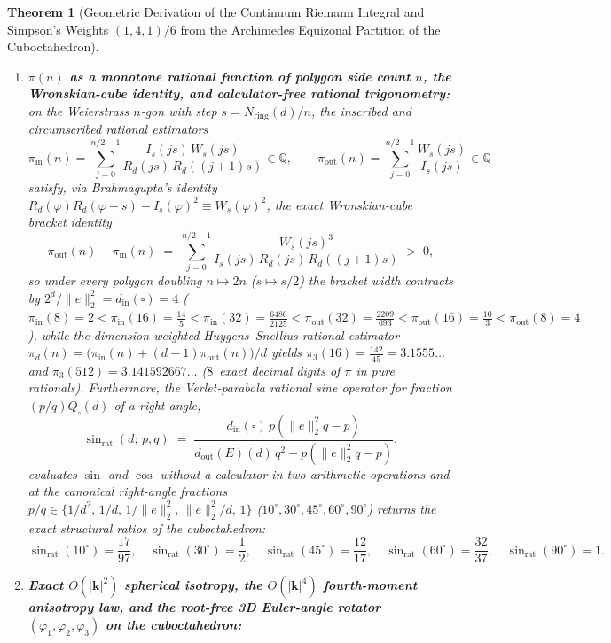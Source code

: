 \documentclass[11pt,a4paper]{article}
\theoremstyle{plain}
\newtheorem{theorem}{Theorem}[section]
\theoremstyle{definition}
\begin{document}
\begin{theorem}[Geometric Derivation of the Continuum Riemann Integral and Simpson's Weights $(1,4,1)/6$ from the Archimedes Equizonal Partition of the Cuboctahedron]
\begin{enumerate}[label=\textbf{(\roman*)},leftmargin=*]
\item \textbf{$\pi(n)$ as a monotone rational function of polygon side count $n$, the Wronskian-cube identity, and calculator-free rational trigonometry:}
  on the Weierstrass $n$-gon with step $s = N_{\mathrm{ring}}(d)/n$, the inscribed and circumscribed rational estimators
  \[
    \pi_{\mathrm{in}}(n) = \sum_{j=0}^{n/2-1}\frac{I_s(js)\,W_s(js)}{R_d(js)\,R_d((j+1)s)}\in\mathbb{Q},\qquad
    \pi_{\mathrm{out}}(n) = \sum_{j=0}^{n/2-1}\frac{W_s(js)}{I_s(js)}\in\mathbb{Q}
  \]
  satisfy, via Brahmagupta's identity $R_d(\varphi)R_d(\varphi+s)-I_s(\varphi)^2 \equiv W_s(\varphi)^2$, the exact \emph{Wronskian-cube bracket identity}
  \begin{equation}
    \label{eq:wronskian-cube-pi-gap}
    \pi_{\mathrm{out}}(n) - \pi_{\mathrm{in}}(n) \;=\; \sum_{j=0}^{n/2-1}\frac{W_s(js)^3}{I_s(js)\,R_d(js)\,R_d((j+1)s)} \;>\; 0,
  \end{equation}
  so under every polygon doubling $n\mapsto 2n$ ($s\mapsto s/2$) the bracket width contracts by $2^d/\|e\|_2^2 = d_{\mathrm{in}}(\square) = 4$ ($\pi_{\mathrm{in}}(8)=2 < \pi_{\mathrm{in}}(16)=\frac{14}{5} < \pi_{\mathrm{in}}(32)=\frac{6486}{2125} < \pi_{\mathrm{out}}(32)=\frac{2209}{693} < \pi_{\mathrm{out}}(16)=\frac{10}{3} < \pi_{\mathrm{out}}(8)=4$), while the dimension-weighted Huygens--Snellius rational estimator $\pi_d(n) = \bigl(\pi_{\mathrm{in}}(n)+(d-1)\pi_{\mathrm{out}}(n)\bigr)/d$ yields $\pi_3(16) = \frac{142}{45} = 3.1555\dots$ and $\pi_3(512) = 3.141592667\dots$ ($8$~exact decimal digits of $\pi$ in pure rationals). Furthermore, the Verlet-parabola rational sine operator for fraction $(p/q)Q_\square(d)$ of a right angle,
  \[
    \sin_{\mathrm{rat}}(d;\,p,q) \;=\; \frac{d_{\mathrm{in}}(\square)\,p(\|e\|_2^2 q - p)}{d_{\mathrm{out}}(E)(d)\,q^2 - p(\|e\|_2^2 q - p)},
  \]
  evaluates $\sin$ and $\cos$ without a calculator in two arithmetic operations and at the canonical right-angle fractions $p/q\in\{1/d^2,\,1/d,\,1/\|e\|_2^2,\,\|e\|_2^2/d,\,1\}$ ($10^\circ,30^\circ,45^\circ,60^\circ,90^\circ$) returns the exact structural ratios of the cuboctahedron:
  \[
    \sin_{\mathrm{rat}}(10^\circ) = \frac{17}{97},\quad
    \sin_{\mathrm{rat}}(30^\circ) = \frac{1}{2},\quad
    \sin_{\mathrm{rat}}(45^\circ) = \frac{12}{17},\quad
    \sin_{\mathrm{rat}}(60^\circ) = \frac{32}{37},\quad
    \sin_{\mathrm{rat}}(90^\circ) = 1.
  \]
\item \textbf{Exact $O(|\mathbf{k}|^2)$ spherical isotropy, the $O(|\mathbf{k}|^4)$ fourth-moment anisotropy law, and the root-free 3D Euler-angle rotator $(\varphi_1,\varphi_2,\varphi_3)$ on the cuboctahedron:}

\end{enumerate}
\end{theorem}
\end{document}
